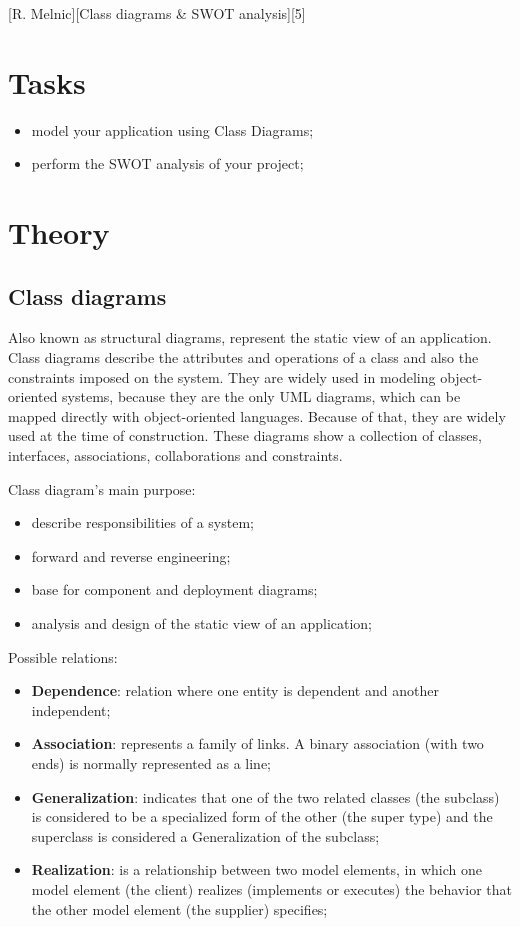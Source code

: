 \documentclass{article}
\begin{document}
	[R. Melnic][Class diagrams \& SWOT analysis][5]


	\section{Tasks}
		\begin{itemize}
			\item model your application using Class Diagrams;
			\item perform the SWOT analysis of your project;
		\end{itemize}

	\section{Theory}
		\subsection{Class diagrams}
			Also known as structural diagrams, represent the static view of an application. Class diagrams describe the attributes and operations of a class and also the constraints imposed on the system. They are widely used in modeling object-oriented systems, because they are the only UML diagrams, which can be mapped directly with object-oriented languages. Because of that, they are widely used at the time of construction. These diagrams show a collection of classes, interfaces, associations, collaborations and constraints.

			\bigskip
			Class diagram's main purpose:
			\begin{itemize}
				\item describe responsibilities of a system;
				\item forward and reverse engineering;
				\item base for component and deployment diagrams;
				\item analysis and design of the static view of an application;
			\end{itemize}

			\bigskip
			Possible relations:
			\begin{itemize}
				\item \textbf{Dependence}: relation where one entity is dependent and another independent;
				\item \textbf{Association}: represents a family of links. A binary association (with two ends) is normally represented as a line;
				\item \textbf{Generalization}: indicates that one of the two related classes (the subclass) is considered to be a specialized form of the other (the super type) and the superclass is considered a Generalization of the subclass;
				\item \textbf{Realization}: is a relationship between two model elements, in which one model element (the client) realizes (implements or executes) the behavior that the other model element (the supplier) specifies;
			\end{itemize}
\end{document}
